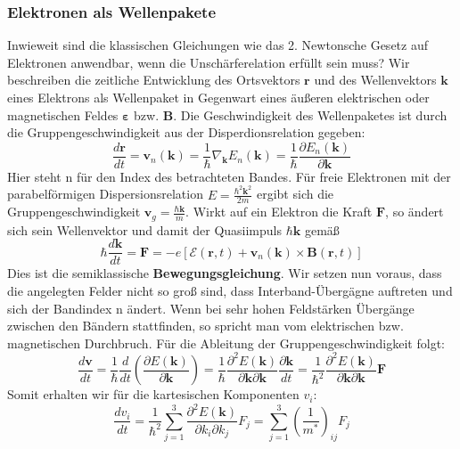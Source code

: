 \documentclass[11pt]{article}
\begin{document}
\subsubsection{Elektronen als Wellenpakete}
Inwieweit sind die klassischen Gleichungen wie das 2. Newtonsche Gesetz auf
Elektronen anwendbar, wenn die Unschärferelation erfüllt sein muss?
Wir beschreiben die zeitliche Entwicklung des Ortsvektors $\bm{r}$ und des
Wellenvektors $\bm{k}$ eines Elektrons als Wellenpaket in Gegenwart eines
äußeren elektrischen oder magnetischen Feldes $\bm{\varepsilon}$ bzw.
$\bm{B}$. Die Geschwindigkeit des Wellenpaketes ist durch die
Gruppengeschwindigkeit aus der Disperdionsrelation gegeben:
\begin{equation}
  \frac{d\bm{r}}{dt}=\bm{v}_n(\bm{k})=\frac{1}{\hbar}\nabla_{\bm{k}}E_n(\bm{k})
  =\frac{1}{\hbar}\frac{\partial E_n(\bm{k})}{\partial\bm{k}}
\end{equation}
Hier steht n für den Index des betrachteten Bandes. Für freie Elektronen mit der
parabelförmigen Dispersionsrelation $E=\frac{\hbar^2\bm{k}^2}{2m}$ ergibt sich
die Gruppengeschwindigkeit $\bm{v}_g=\frac{\hbar\bm{k}}{m}$. Wirkt auf ein
Elektron die Kraft $\bm{F}$, so ändert sich sein Wellenvektor und damit der
Quasiimpuls $\hbar\bm{k}$ gemäß
\begin{equation}
  \hbar\frac{d\bm{k}}{dt}=\bm{F}=-e\left[\mathcal{E}(\bm{r},t)+\bm{v}_n(\bm{k})
  \times\bm{B}(\bm{r},t)\right]
\end{equation}
Dies ist die semiklassische \textbf{Bewegungsgleichung}. Wir setzen nun voraus,
dass die angelegten Felder nicht so groß sind, dass Interband-Übergägne
auftreten und sich der Bandindex n ändert. Wenn bei sehr hohen Feldstärken
Übergänge zwischen den Bändern stattfinden, so spricht man vom elektrischen
bzw. magnetischen Durchbruch. Für die Ableitung der Gruppengeschwindigkeit
folgt:
\begin{equation}
  \frac{d\bm{v}}{dt}=\frac{1}{\hbar}\frac{d}{dt}\left(\frac{\partial E(\bm{k})}
  {\partial\bm{k}}\right)=\frac{1}{\hbar}\frac{\partial^2E(\bm{k})}
  {\partial\bm{k}\partial\bm{k}}\frac{\partial\bm{k}}{dt}=
  \frac{1}{\hbar^2}\frac{\partial^2E(\bm{k})}
  {\partial\bm{k}\partial\bm{k}}\bm{F}
\end{equation}
Somit erhalten wir für die kartesischen Komponenten $v_i$:
\begin{equation}
  \frac{dv_i}{dt}=\frac{1}{\hbar^2}\sum_{j=1}^{3}\frac{\partial^2E(\bm{k})}
  {\partial k_i\partial k_j}F_j=\sum_{j=1}^{3}\left(\frac{1}{m^*}\right)_{ij}F_j
\end{equation}
\end{document}
